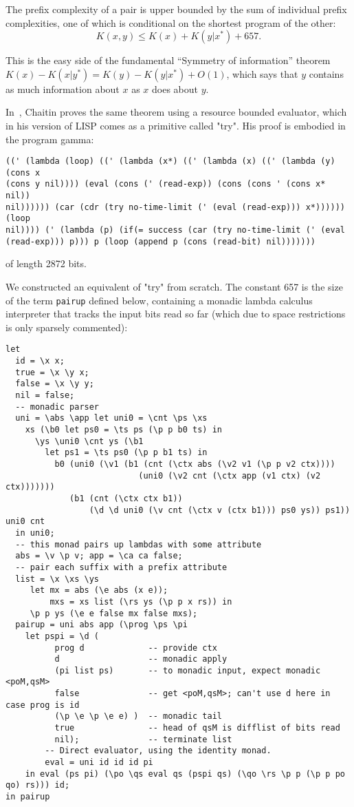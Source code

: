 \documentclass{article}
\begin{document}
The prefix complexity of a pair is upper bounded by the sum of
individual prefix complexities, one of which is conditional on
the shortest program of the other:
\[  K(x,y) \leq K(x) + K(y|x^{\ast}) + 657. \]

This is the easy side of the fundamental ``Symmetry of information''
theorem $K(x)-K(x|y^{\ast}) = K(y)-K(y|x^{\ast}) + O(1)$, which
says that $y$ contains as much information about $x$ as $x$ does about $y$.

In~\cite{ch01}, Chaitin proves the same theorem using a resource bounded evaluator,
which in his version of LISP comes as a primitive called "try".
His proof is embodied in the program gamma:

{\small
\begin{verbatim}
((' (lambda (loop) ((' (lambda (x*) ((' (lambda (x) ((' (lambda (y) (cons x
(cons y nil)))) (eval (cons (' (read-exp)) (cons (cons ' (cons x* nil))
nil)))))) (car (cdr (try no-time-limit (' (eval (read-exp))) x*)))))) (loop
nil)))) (' (lambda (p) (if(= success (car (try no-time-limit (' (eval
(read-exp))) p))) p (loop (append p (cons (read-bit) nil)))))))
\end{verbatim}
}

of length 2872 bits.

We constructed an equivalent of "try" from scratch.
The constant 657 is the size of the term {\tt pairup} defined below,
containing a monadic lambda calculus interpreter that tracks the input bits read so far
(which due to space restrictions is only sparsely commented):

{\small
\begin{verbatim}
let
  id = \x x;
  true = \x \y x;
  false = \x \y y;
  nil = false;
  -- monadic parser
  uni = \abs \app let uni0 = \cnt \ps \xs
    xs (\b0 let ps0 = \ts ps (\p p b0 ts) in
      \ys \uni0 \cnt ys (\b1
        let ps1 = \ts ps0 (\p p b1 ts) in
          b0 (uni0 (\v1 (b1 (cnt (\ctx abs (\v2 v1 (\p p v2 ctx))))
                           (uni0 (\v2 cnt (\ctx app (v1 ctx) (v2 ctx)))))))
             (b1 (cnt (\ctx ctx b1))
                 (\d \d uni0 (\v cnt (\ctx v (ctx b1))) ps0 ys)) ps1)) uni0 cnt
  in uni0;
  -- this monad pairs up lambdas with some attribute
  abs = \v \p v; app = \ca ca false;
  -- pair each suffix with a prefix attribute
  list = \x \xs \ys
     let mx = abs (\e abs (x e));
         mxs = xs list (\rs ys (\p p x rs)) in
     \p p ys (\e e false mx false mxs);
  pairup = uni abs app (\prog \ps \pi
    let pspi = \d (
          prog d             -- provide ctx
          d                  -- monadic apply
          (pi list ps)       -- to monadic input, expect monadic <poM,qsM>
          false              -- get <poM,qsM>; can't use d here in case prog is id
          (\p \e \p \e e) )  -- monadic tail
          true               -- head of qsM is difflist of bits read
          nil);              -- terminate list
        -- Direct evaluator, using the identity monad.
        eval = uni id id id pi
    in eval (ps pi) (\po \qs eval qs (pspi qs) (\qo \rs \p p (\p p po qo) rs))) id;
in pairup
\end{verbatim}
}
\end{document}
